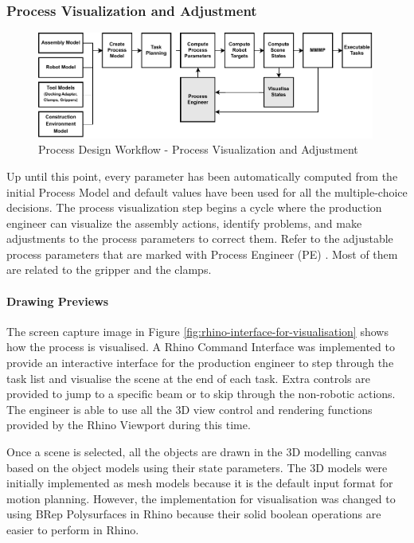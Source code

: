 \FloatBarrier

\subsubsection{Process Visualization and Adjustment}
\label{subsubsection:exploration-3-process-visualization-and-adjustment}

\begin{figure}[!h]
    \centering
    \includegraphics[width=0.99\textwidth]{images/6a/process_6.pdf}
    \caption{Process Design Workflow - Process Visualization and Adjustment}
    \label{fig:process-design-6}
\end{figure}

Up until this point, every parameter has been automatically computed from the initial Process Model and default values have been used for all the multiple-choice decisions. The process visualization step begins a cycle where the production engineer can visualize the assembly actions, identify problems, and make adjustments to the process parameters to correct them. Refer to the adjustable process parameters that are marked with Process Engineer (PE) . Most of them are related to the gripper and the clamps.

\paragraph{Drawing Previews}

The screen capture image in Figure \ref{fig:rhino-interface-for-visualisation} shows how the process is visualised. A Rhino Command Interface was implemented to provide an interactive interface for the production engineer to step through the task list and visualise the scene at the end of each task. Extra controls are provided to jump to a specific beam or to skip through the non-robotic actions. The engineer is able to use all the 3D view control and rendering functions provided by the Rhino Viewport during this time.

Once a scene is selected, all the objects are drawn in the 3D modelling canvas based on the object models using their state parameters. The 3D models were initially implemented as mesh models because it is the default input format for motion planning. However, the implementation for visualisation was changed to using BRep Polysurfaces in Rhino because their solid boolean operations are easier to perform in Rhino.

